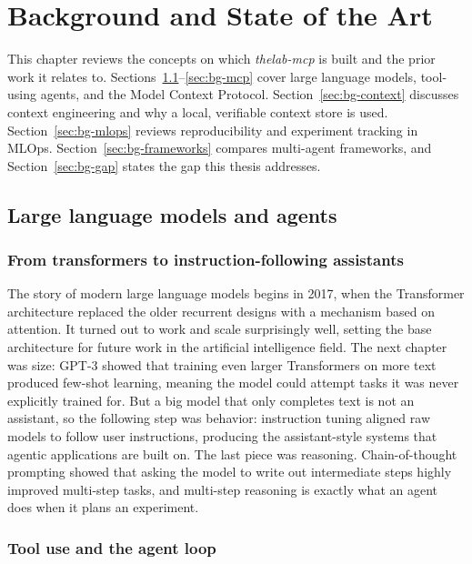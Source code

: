 \chapter{Background and State of the Art}
\label{ch:background}

This chapter reviews the concepts on which \emph{thelab-mcp} is built and the prior work it relates to. Sections~\ref{sec:bg-llm}--\ref{sec:bg-mcp} cover large language models, tool-using agents, and the Model Context Protocol. Section~\ref{sec:bg-context} discusses context engineering and why a local, verifiable context store is used. Section~\ref{sec:bg-mlops} reviews reproducibility and experiment tracking in MLOps. Section~\ref{sec:bg-frameworks} compares multi-agent frameworks, and Section~\ref{sec:bg-gap} states the gap this thesis addresses.

\section{Large language models and agents}
\label{sec:bg-llm}

\subsection{From transformers to instruction-following assistants}

The story of modern large language models begins in 2017, when the Transformer architecture \cite{vaswani2017attention} replaced the older recurrent designs with a mechanism based on attention. It turned out to work and scale surprisingly well, setting the base architecture for future work in the artificial intelligence field. The next chapter was size: GPT-3 \cite{brown2020gpt3} showed that training even larger Transformers on more text produced few-shot learning, meaning the model could attempt tasks it was never explicitly trained for. But a big model that only completes text is not an assistant, so the following step was behavior: instruction tuning \cite{ouyang2022instructgpt} aligned raw models to follow user instructions, producing the assistant-style systems that agentic applications are built on. The last piece was reasoning. Chain-of-thought prompting \cite{wei2022cot} showed that asking the model to write out intermediate steps highly improved multi-step tasks, and multi-step reasoning is exactly what an agent does when it plans an experiment.

\subsection{Tool use and the agent loop}


